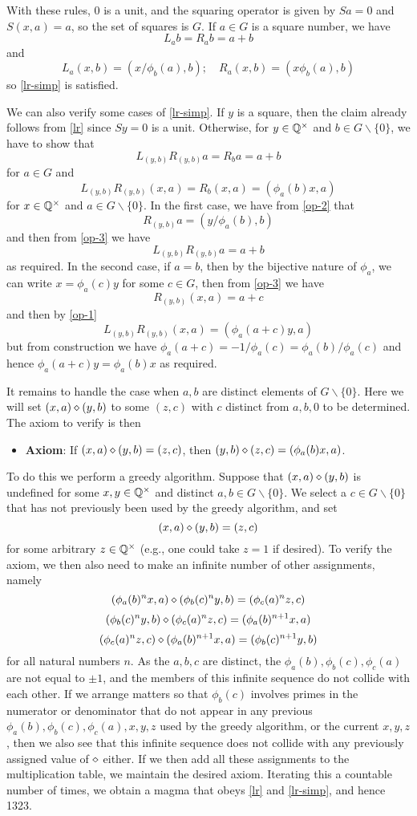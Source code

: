 With these rules, $0$ is a unit, and the squaring operator is given by $Sa = 0$ and $S(x,a) = a$, so the set of squares is $G$.  If $a \in G$ is a square number, we have
$$ L_a b = R_a b = a+b$$
and
$$ L_a (x,b) = (x/\phi_b(a), b); \quad R_a (x,b) = (x \phi_b(a), b)$$
so \eqref{lr-simp} is satisfied.

We can also verify some cases of \eqref{lr-simp}.  If $y$ is a square, then the claim already follows from \eqref{lr} since $Sy=0$ is a unit.  Otherwise, for $y \in \mathbb{Q}^\times$ and $b \in G \backslash \{0\}$, we have to show that
$$ L_{(y,b)} R_{(y,b)} a = R_b a = a+b$$
for $a \in G$ and
$$ L_{(y,b)} R_{(y,b)} (x,a) = R_b (x,a) = (\phi_a(b) x, a) $$
for $x \in \mathbb{Q}^\times$ and $a \in G \backslash \{0\}$.  In the first case, we have from \eqref{op-2} that
$$ R_{(y,b)} a = (y/\phi_a(b), b)$$
and then from \eqref{op-3} we have
$$L_{(y,b)} R_{(y,b)} a = a+b$$
as required.  In the second case, if $a=b$, then by the bijective nature of $\phi_a$, we can write $x = \phi_a(c) y$ for some $c \in G$, then from \eqref{op-3} we have
$$ R_{(y,b)} (x,a) = a+c$$
and then by \eqref{op-1}
$$ L_{(y,b)} R_{(y,b)} (x,a) = (\phi_a(a+c) y, a)$$
but from construction we have $\phi_a(a+c)=-1/\phi_a(c) = \phi_a(b)/\phi_a(c)$ and hence $\phi_a(a+c) y = \phi_a(b) x$ as required.

It remains to handle the case when $a,b$ are distinct elements of $G \backslash \{0\}$.  Here we will set $(x,a) \diamond (y,b)$ to some $(z,c)$ with $c$ distinct from $a,b,0$ to be determined.  The axiom to verify is then
\begin{itemize}
\item {\bf Axiom}: If $(x,a) \diamond (y,b) = (z,c)$, then $(y,b) \diamond (z,c) = (\phi_a(b) x,a)$.
\end{itemize}

To do this we perform a greedy algorithm.  Suppose that $(x,a) \diamond (y,b)$ is undefined for some $x,y \in \mathbb{Q}^\times$ and distinct $a,b \in G \backslash \{0\}$.  We select a $c \in G \backslash \{0\}$ that has not previously been used by the greedy algorithm, and set
$$ (x,a) \diamond (y,b) = (z,c)$$
for some arbitrary $z \in \mathbb{Q}^\times$ (e.g., one could take $z=1$ if desired).  To verify the axiom, we then also need to make an infinite number of other assignments, namely
$$ (\phi_a(b)^n x,a) \diamond (\phi_b(c)^n y,b) = (\phi_c(a)^n z,c)$$
$$ (\phi_b(c)^n y,b) \diamond (\phi_c(a)^n z,c) = (\phi_a(b)^{n+1} x, a)$$
$$ (\phi_c(a)^n z,c) \diamond (\phi_a(b)^{n+1} x, a) = (\phi_b(c)^{n+1} y,b)$$
for all natural numbers $n$.  As the $a,b,c$ are distinct, the $\phi_a(b), \phi_b(c), \phi_c(a)$ are not equal to $\pm 1$, and the members of this infinite sequence do not collide with each other.  If we arrange matters so that $\phi_b(c)$ involves primes in the numerator or denominator that do not appear in any previous $\phi_a(b), \phi_b(c), \phi_c(a), x, y, z$ used by the greedy algorithm, or the current $x,y,z$, then we also see that this infinite sequence does not collide with any previously assigned value of $\diamond$ either.  If we then add all these assignments to the multiplication table, we maintain the desired axiom.  Iterating this a countable number of times, we obtain a magma that obeys \eqref{lr} and \eqref{lr-simp}, and hence 1323.

